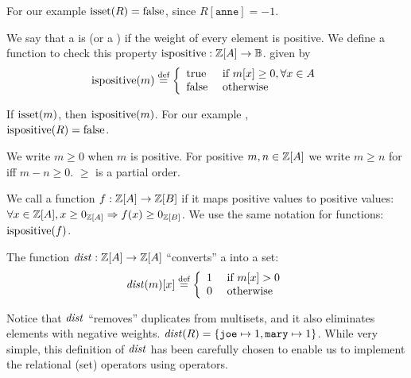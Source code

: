 \ifzsetexamples
\noindent For our example $\mbox{isset}(R) = \mbox{false}$, since $R[\texttt{anne}] = -1$.
\fi

\begin{definition}
We say that a \zr is  (or a ) if the weight of every element is
positive.  We define a function to check this property
$\mbox{ispositive} : \mathbb{Z}[A] \rightarrow \mathbb{B}$.
given by
$$\mbox{ispositive}(m) \stackrel{\textrm{\scriptsize def}}{=} \left\{
\begin{array}{ll}
  \mbox{true} & \mbox{ if } m[x] \geq 0, \forall x \in A \\
  \mbox{false} & \mbox{ otherwise}
\end{array}
\right.$$
\end{definition}
If $\mbox{isset}(m)$, then $\mbox{ispositive}(m)$.  For our example \zr, \\
$\mbox{ispositive}(R) = \mbox{false}$.

We write $m \geq 0$ when $m$ is positive.  For positive $m, n \in
\mathbb{Z}[A]$ we write $m \geq n$ for iff $m - n \geq 0$.  $\geq$ is a
partial order.

We call a function $f : \mathbb{Z}[A] \rightarrow \mathbb{Z}[B]$  if it maps
positive values to positive values:
$\forall x \in \mathbb{Z}[A], x \geq 0_{\mathbb{Z}[A]} \Rightarrow f(x) \geq 0_{\mathbb{Z}[B]}$.
We use the same notation for functions: $\mbox{ispositive}(f)$.

\begin{definition}[distinct]
The function $\mathit{dist}: \\ \mathbb{Z}[A] \rightarrow \mathbb{Z}[A]$
``converts'' a \zr into a set:
$$\mathit{dist}(m)[x] \stackrel{\textrm{\scriptsize def}}{=} \left\{
\begin{array}{ll}
  1 & \mbox{ if } m[x] > 0 \\
  0 & \mbox{ otherwise}
\end{array}
\right.
$$
\end{definition}

Notice that $\mathit{dist}$ ``removes'' duplicates from multisets, and it also eliminates
elements with negative weights.
\ifzsetexamples
$\mathit{dist}(R) = \{ \texttt{joe} \mapsto 1, \texttt{mary} \mapsto 1 \}$.
\fi
While very simple, this definition of $\mathit{dist}$ has been carefully
chosen to enable us to implement the relational (set) operators
using \zrs operators.

%
%
